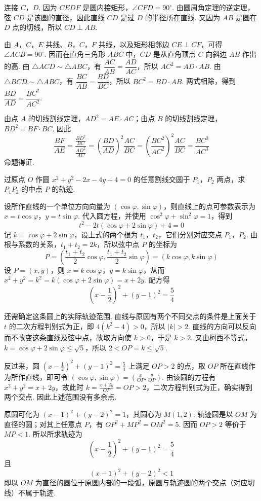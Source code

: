 \begin{solution}
连接 \(C\)，\(D\). 因为 \(CEDF\) 是圆内接矩形，\(\angle CFD=90^\circ\). 由圆周角定理的逆定理，弦 \(CD\) 是该圆的直径，因此直线 \(CD\) 是过 \(D\) 的半径所在直线. 又因为 \(AB\) 是圆在 \(D\) 点的切线，所以 \(CD\perp AB\).

由 \(A\)，\(C\)，\(E\) 共线、\(B\)，\(C\)，\(F\) 共线，以及矩形相邻边 \(CE\perp CF\)，可得 \(\angle ACB=90^\circ\). 因而在直角三角形 \(ABC\) 中，\(CD\) 是从直角顶点 \(C\) 向斜边 \(AB\) 作出的高. 由 \(\triangle ACD\sim\triangle ABC\)，有 \(\dfrac{AC}{AB}=\dfrac{AD}{AC}\)，所以 \(AC^2=AD\cdot AB\). 由 \(\triangle BCD\sim\triangle ABC\)，有 \(\dfrac{BC}{AB}=\dfrac{BD}{BC}\)，所以 \(BC^2=BD\cdot AB\). 两式相除，得到 \(\dfrac{BD}{AD}=\dfrac{BC^2}{AC^2}\).

由点 \(A\) 的切线割线定理，\(AD^2=AE\cdot AC\)；由点 \(B\) 的切线割线定理，\(BD^2=BF\cdot BC\). 因此
\[
\frac{BF}{AE}=\frac{\frac{BD^2}{BC}}{\frac{AD^2}{AC}}=\left(\frac{BD}{AD}\right)^2\frac{AC}{BC}=\left(\frac{BC^2}{AC^2}\right)^2\frac{AC}{BC}=\frac{BC^3}{AC^3}
\]
命题得证.
\end{solution}

\begin{problem}
过原点 \(O\) 作圆 \(x^{2} + y^{2} - 2x - 4y + 4 = 0\) 的任意割线交圆于 \(P_{1}\)，\(P_{2}\) 两点，求 \(P_{1}P_{2}\) 的中点 \(P\) 的轨迹.
\end{problem}

\begin{solution}
设所作直线的一个单位方向向量为 \((\cos\varphi,\sin\varphi)\)，则直线上的点可参数表示为 \(x=t\cos\varphi\)，\(y=t\sin\varphi\). 代入圆方程，并使用 \(\cos^2\varphi+\sin^2\varphi=1\)，得到
\[
t^2-2t(\cos\varphi+2\sin\varphi)+4=0
\]
记 \(k=\cos\varphi+2\sin\varphi\)，设上式的两个根为 \(t_1\)，\(t_2\)，它们分别对应交点 \(P_1\)，\(P_2\). 由根与系数的关系，\(t_1+t_2=2k\)，所以弦中点 \(P\) 的坐标为
\[
P=\left(\frac{t_1+t_2}{2}\cos\varphi,\frac{t_1+t_2}{2}\sin\varphi\right)=(k\cos\varphi,k\sin\varphi)
\]
设 \(P=(x,y)\)，则 \(x=k\cos\varphi\)，\(y=k\sin\varphi\)，从而 \(x^2+y^2=k^2=k(\cos\varphi+2\sin\varphi)=x+2y\). 配方得
\[
\left(x-\frac{1}{2}\right)^2+(y-1)^2=\frac{5}{4}
\]

还需确定这条圆上的实际轨迹范围. 直线与原圆有两个不同交点的条件是上面关于 \(t\) 的二次方程判别式为正，即 \(4(k^2-4)>0\)，所以 \(|k|>2\). 直线的方向可以反向而不改变这条直线及弦中点，故取方向使 \(k>0\)，于是 \(k>2\). 又由柯西不等式，\(k=\cos\varphi+2\sin\varphi\leqslant\sqrt{5}\)，所以 \(2<OP=k\leqslant\sqrt{5}\).

反过来，圆 \(\left(x-\frac{1}{2}\right)^2+(y-1)^2=\frac{5}{4}\) 上满足 \(OP>2\) 的点，取 \(OP\) 所在直线作为所作直线，即可令 \((\cos\varphi,\sin\varphi)=\left(\frac{x}{OP},\frac{y}{OP}\right)\). 由该圆的方程有 \(x^2+y^2=x+2y\)，故此时 \(k=\frac{x+2y}{OP}=OP>2\)，二次方程判别式为正，确实得到两个交点. 因此上述范围没有多余点.

原圆可化为 \((x-1)^2+(y-2)^2=1\)，其圆心为 \(M(1,2)\). 轨迹圆是以 \(OM\) 为直径的圆；对其上任意点 \(P\)，有 \(OP^2+MP^2=OM^2=5\). 因而 \(OP>2\) 等价于 \(MP<1\). 所以所求轨迹为
\[
\left(x-\frac{1}{2}\right)^2+(y-1)^2=\frac{5}{4}
\]
且
\[
(x-1)^2+(y-2)^2<1
\]
即以 \(OM\) 为直径的圆位于原圆内部的一段弧，原圆与轨迹圆的两个交点（对应切线）不属于轨迹.
\end{solution}
